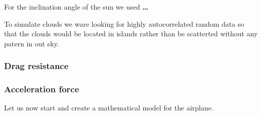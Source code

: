 For the inclination angle of the sun we used \textbf{\dots}

To simulate clouds we ware looking for highly autocorrelated random data so that the clouds would be located in islands rather than be scatterted without any patern in out sky.

\subsubsection{Drag resistance}

\subsubsection{Acceleration force}


Let us now start and create a mathematical model for the airplane.

